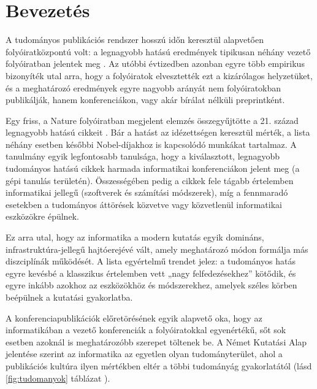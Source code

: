 \documentclass[12pt,a4paper]{article}
\begin{document}

\section{Bevezetés}

A tudományos publikációs rendszer hosszú időn keresztül alapvetően folyóiratközpontú volt: a legnagyobb hatású eredmények tipikusan néhány vezető folyóiratban jelentek meg 
\cite{ioannidis2006concentration}. Az utóbbi évtizedben azonban egyre több empirikus bizonyíték utal arra, hogy a folyóiratok elvesztették ezt a kizárólagos helyzetüket, és a meghatározó eredmények egyre nagyobb arányát nem folyóiratokban publikálják, hanem konferenciákon, vagy akár bírálat nélküli preprintként.

Egy friss, a Nature folyóiratban megjelent elemzés összegyűjtötte a 21. század legnagyobb hatású cikkeit \cite{hutson2025most}. Bár a hatást az idézettségen keresztül mérték, a lista néhány esetben későbbi Nobel-díjakhoz is kapcsolódó munkákat tartalmaz. A tanulmány egyik legfontosabb tanulsága, hogy a kiválasztott, legnagyobb tudományos hatású cikkek harmada informatikai konferenciákon jelent meg (a gépi tanulás területén). Összességében pedig a cikkek fele tágabb értelemben informatikai jellegű (szoftverek és számítási módszerek), míg a fennmaradó esetekben a tudományos áttörések közvetve vagy közvetlenül informatikai eszközökre épülnek.

Ez arra utal, hogy az informatika a modern kutatás egyik domináns, infrastruktúra-jellegű hajtóerejévé vált, amely meghatározó módon formálja más diszciplínák működését. A lista egyértelmű trendet jelez: a tudományos hatás egyre kevésbé a klasszikus értelemben vett „nagy felfedezésekhez” kötődik, és egyre inkább azokhoz az eszközökhöz és módszerekhez, amelyek széles körben beépülnek a kutatási gyakorlatba.



A konferenciapublikációk előretörésének egyik alapvető oka, hogy az informatikában a vezető konferenciák a folyóiratokkal egyenértékű, sőt sok esetben azoknál is meghatározóbb szerepet töltenek be. A Német Kutatási Alap jelentése szerint az informatika az egyetlen olyan tudományterület, ahol a publikációs kultúra ilyen mértékben eltér a többi tudományág gyakorlatától (lásd \ref{fig:tudomanyok} táblázat  \cite{DFG2022Publishing}).

\end{document}
